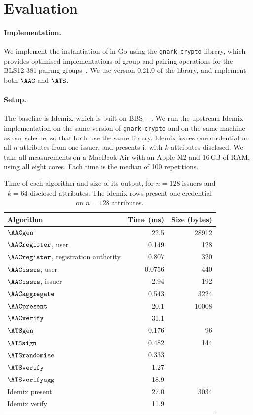 \section{Evaluation}\label{sec:agg-creds-evaluation}

\paragraph{Implementation.} We implement the instantiation of  in Go using
the \texttt{gnark-crypto} library, which provides optimised implementations of
group and pairing operations for the BLS12-381 pairing groups~\cite{gnark-crypto}.
We use version 0.21.0 of the library, and implement both $\AAC$ and $\ATS$.

\paragraph{Setup.} The baseline is Idemix, which is built on
BBS+~\cite{CCS:CamVan02,SCN:AuSusMu06,CDL16}. We run the upstream
Idemix implementation on the same version of \texttt{gnark-crypto} and on the
same machine as our scheme, so that both use the same library. Idemix issues one credential on all $n$ attributes
from one issuer, and presents it with $k$ attributes disclosed. We take all measurements
on a MacBook Air with an Apple M2 and 16\,GB of RAM, using all eight
cores. Each time is the median of 100 repetitions.

\begin{table}[htbp] \centering \small \setlength{\tabcolsep}{3.5pt}
  \begin{tabular}{@{}l r r@{}}
    \toprule
    Algorithm & Time (ms) & Size (bytes) \\
    \midrule
    $\AACgen$ & 22.5 & 28912 \\
    $\AACregister$, user & 0.149 & 128 \\
    $\AACregister$, registration authority & 0.807 & 320 \\
    $\AACissue$, user & 0.0756 & 440 \\
    $\AACissue$, issuer & 2.94 & 192 \\
    $\AACaggregate$ & 0.543 & 3224 \\
    $\AACpresent$ & 20.1 & 10008 \\
    $\AACverify$ & 31.1 & \\
    \midrule
    $\ATSgen$ & 0.176 & 96 \\
    $\ATSsign$ & 0.482 & 144 \\
    $\ATSrandomise$ & 0.333 & \\
    $\ATSverify$ & 1.27 & \\
    $\ATSverifyagg$ & 18.9 & \\
    \midrule
    Idemix present & 27.0 & 3034 \\
    Idemix verify & 11.9 & \\
    \bottomrule
  \end{tabular}
  \caption[Aggregate credentials: times and sizes]{Time of each algorithm and
size of its output, for $n = 128$ issuers and $k = 64$ disclosed attributes.
The Idemix rows present one credential on $n = 128$ attributes.}
  \label{tab:agg-creds-times}
\end{table}

